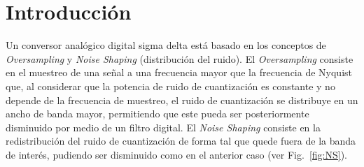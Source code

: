 \documentclass[a4paper,conference]{IEEEtran}
\begin{document}




\maketitle


\begin{abstract}
En el desarrollo de esta publicación, se presenta un conversor analógico digital en una \textit{FPGA}, implementado bajo una topología Sigma-Delta la cual permite una realización con una cantidad muy pequeña de hardware externo. También, se buscaron distintas topologías de filtrado digital para aprovechar los recursos propios de la \textit{FPGA}. Finalmente, se desarrollaron simulaciones y metodologías de medición para poder caracterizarlo y poder realizar la comparación con los resultados ideales. \\
Como resultado del trabajo se ha obtenido un conversor analógico digital de 9 bits efectivos en bajas frecuencias, con una frecuencia de muestreo de 22KHz.    

\end{abstract}





%
\IEEEpeerreviewmaketitle



\section{Introducci\'on}
Un conversor analógico digital sigma delta est\'a basado en los conceptos de \textit{Oversampling} y \textit{Noise Shaping} (distribuci\'on del ruido). El \textit{Oversampling} consiste en el muestreo de una señal a una frecuencia mayor que la frecuencia de Nyquist que, al considerar que la potencia de ruido de cuantización es constante y no depende de la frecuencia de muestreo, el ruido de cuantizaci\'on se distribuye en un ancho de banda mayor, permitiendo que este pueda ser posteriormente disminuido por medio de un filtro digital. El \textit{Noise Shaping} consiste en la redistribución del ruido de cuantizaci\'on de forma tal que quede fuera de la banda de inter\'es, pudiendo ser disminuido como en el anterior caso (ver Fig.~\ref{fig:NS}).
\end{document}
